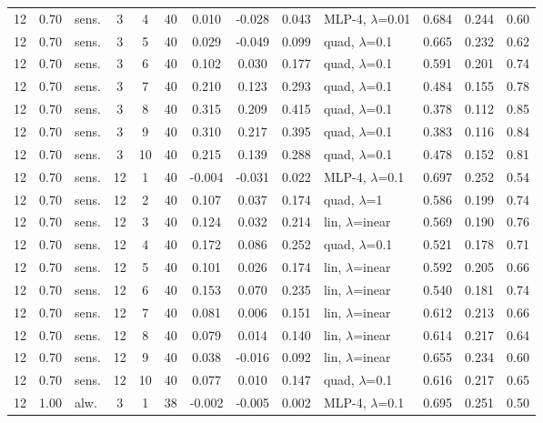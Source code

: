 \documentclass[10pt]{article}
\begin{document}
\begin{scriptsize}
\begin{longtable}{cclcc c ccc l ccc}
12 & 0.70 & sens. & 3 & 4 & 40 & 0.010 & -0.028 & 0.043 & MLP-4, $\lambda$=0.01 & 0.684 & 0.244 & 0.60 \\
12 & 0.70 & sens. & 3 & 5 & 40 & 0.029 & -0.049 & 0.099 & quad, $\lambda$=0.1 & 0.665 & 0.232 & 0.62 \\
12 & 0.70 & sens. & 3 & 6 & 40 & 0.102 & 0.030 & 0.177 & quad, $\lambda$=0.1 & 0.591 & 0.201 & 0.74 \\
12 & 0.70 & sens. & 3 & 7 & 40 & 0.210 & 0.123 & 0.293 & quad, $\lambda$=0.1 & 0.484 & 0.155 & 0.78 \\
12 & 0.70 & sens. & 3 & 8 & 40 & 0.315 & 0.209 & 0.415 & quad, $\lambda$=0.1 & 0.378 & 0.112 & 0.85 \\
12 & 0.70 & sens. & 3 & 9 & 40 & 0.310 & 0.217 & 0.395 & quad, $\lambda$=0.1 & 0.383 & 0.116 & 0.84 \\
12 & 0.70 & sens. & 3 & 10 & 40 & 0.215 & 0.139 & 0.288 & quad, $\lambda$=0.1 & 0.478 & 0.152 & 0.81 \\
12 & 0.70 & sens. & 12 & 1 & 40 & -0.004 & -0.031 & 0.022 & MLP-4, $\lambda$=0.1 & 0.697 & 0.252 & 0.54 \\
12 & 0.70 & sens. & 12 & 2 & 40 & 0.107 & 0.037 & 0.174 & quad, $\lambda$=1 & 0.586 & 0.199 & 0.74 \\
12 & 0.70 & sens. & 12 & 3 & 40 & 0.124 & 0.032 & 0.214 & lin, $\lambda$=inear & 0.569 & 0.190 & 0.76 \\
12 & 0.70 & sens. & 12 & 4 & 40 & 0.172 & 0.086 & 0.252 & quad, $\lambda$=0.1 & 0.521 & 0.178 & 0.71 \\
12 & 0.70 & sens. & 12 & 5 & 40 & 0.101 & 0.026 & 0.174 & lin, $\lambda$=inear & 0.592 & 0.205 & 0.66 \\
12 & 0.70 & sens. & 12 & 6 & 40 & 0.153 & 0.070 & 0.235 & lin, $\lambda$=inear & 0.540 & 0.181 & 0.74 \\
12 & 0.70 & sens. & 12 & 7 & 40 & 0.081 & 0.006 & 0.151 & lin, $\lambda$=inear & 0.612 & 0.213 & 0.66 \\
12 & 0.70 & sens. & 12 & 8 & 40 & 0.079 & 0.014 & 0.140 & lin, $\lambda$=inear & 0.614 & 0.217 & 0.64 \\
12 & 0.70 & sens. & 12 & 9 & 40 & 0.038 & -0.016 & 0.092 & lin, $\lambda$=inear & 0.655 & 0.234 & 0.60 \\
12 & 0.70 & sens. & 12 & 10 & 40 & 0.077 & 0.010 & 0.147 & quad, $\lambda$=0.1 & 0.616 & 0.217 & 0.65 \\
12 & 1.00 & alw. & 3 & 1 & 38 & -0.002 & -0.005 & 0.002 & MLP-4, $\lambda$=0.1 & 0.695 & 0.251 & 0.50 \\

\end{longtable}
\end{scriptsize}
\end{document}
